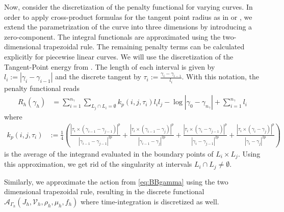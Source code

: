 \documentclass{article}
\def\calA{{\mathcal A}} \def\calB{{\mathcal B}} \def\calC{{\mathcal C}}
\begin{document}
Now, consider the discretization of the penalty functional for varying curves. 
In order to apply cross-product formulas for the tangent point radius as in \cite{bartels_simple_2018} or \cite{yu_repulsive_2021}, we extend the parametrization of the curve into three dimensions by introducing a zero-component.
The integral functionals are approximated using the two-dimensional trapezoidal rule. The remaining penalty terms can be calculated explicitly for piecewise linear curves. We will use the discretization of the Tangent-Point energy from \cite{yu_repulsive_2021}.
The length of each interval is given by $l_i := | \gamma_i - \gamma_{i-1}|$ and the discrete tangent by $\tau_i := \frac{\gamma_i - \gamma_{i-1}}{l_i}$.
With this notation, the penalty functional reads
\begin{align*}
    R_h(\gamma_h) &= \sum\limits_{i=1}^{n_\gamma} \sum\limits_{L_j\cap L_i = \emptyset}  k_p(i,j, \tau_i)l_i l_j  - \log|\gamma_0 - \gamma_{n_\gamma} | + \sum\limits_{i=1}^{n_\gamma} l_i
\end{align*}
where 
\begin{align*}
    k_p(i,j,\tau_i) &:= \frac{1}{4} \left( \frac{| \tau_i \times (\gamma_{i-1} - \gamma_{j-1})|^p}{| \gamma_{i-1} - \gamma_{j-1} |^{2p}} + \frac{| \tau_i \times (\gamma_{i-1} - \gamma_{j})|^p}{| \gamma_{i-1} - \gamma_{j} |^{2p}} + \frac{| \tau_i \times (\gamma_{i} - \gamma_{j-1})|^p}{| \gamma_{i} - \gamma_{j-1} |^{2p}} + \frac{| \tau_i \times (\gamma_{i} - \gamma_{j})|^p}{| \gamma_{i} - \gamma_{j} |^{2p}} \right) 
\end{align*}
is the average of the integrand evaluated in the boundary points of $L_i\times L_j$. 
Using this approximation, we get rid of the singularity at intervals $L_i\cap L_j \neq \emptyset$.

Similarly, we approximate the action from \eqref{eq:BBgamma} using the two dimensional trapezoidal rule, resulting in the discrete functional $\calA_{\Gamma_h}(J_h, \mathcal{V}_h, \rho_h, \mu_h, f_h)$ where time-integration is discretized as well.
\end{document}
